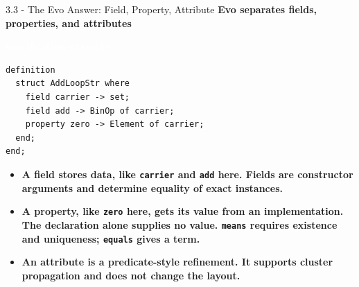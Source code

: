 \documentclass[aspectratio=169,11pt]{beamer}
\newcommand{\statusbadge}[2]{\colorbox{#1}{\textcolor{white}{\strut\scriptsize\sffamily\bfseries #2}}}
\newcommand{\badgeSpec}{\statusbadge{green!35!black}{specification example}}
\begin{document}
\begin{frame}[fragile,t]{3.3 - The Evo Answer: Field, Property, Attribute}
\smallskip
\textbf{\textcolor{blue!55!black}{\textbf{Evo separates fields, properties, and attributes}}}~\badgeSpec
\begin{lstlisting}[language={mizar},basicstyle=\ttfamily\small]
definition
  struct AddLoopStr where
    field carrier -> set;
    field add -> BinOp of carrier;
    property zero -> Element of carrier;
  end;
end;
\end{lstlisting}
\begin{itemize}
\setlength{\itemsep}{1pt}
\setlength{\parsep}{0pt}
\setlength{\parskip}{0pt}
\item \textcolor{blue!55!black}{\textbf{A field stores data, like \texttt{carrier} and \texttt{add} here. Fields are constructor arguments and determine equality of exact instances.}}
\item \textcolor{blue!55!black}{\textbf{A property, like \texttt{zero} here, gets its value from an implementation. The declaration alone supplies no value. \texttt{means} requires existence and uniqueness; \texttt{equals} gives a term.}}
\item \textcolor{blue!55!black}{\textbf{An attribute is a predicate-style refinement. It supports cluster propagation and does not change the layout.}}
\end{itemize}
\end{frame}
\end{document}

